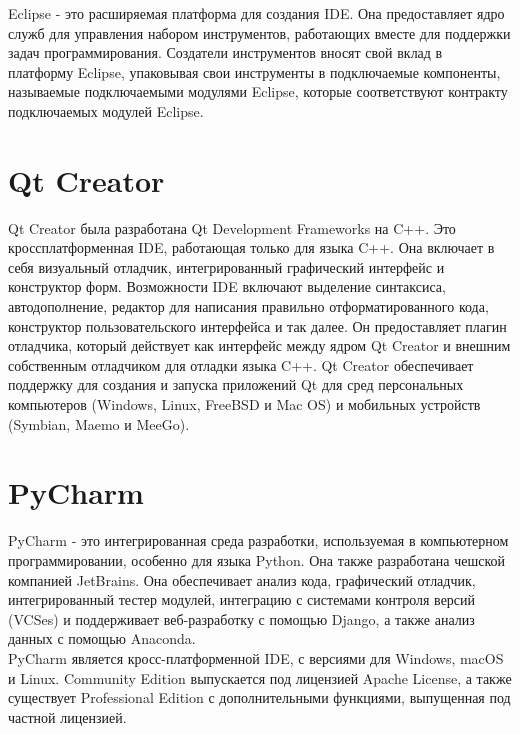 Eclipse - это расширяемая платформа для создания IDE. Она предоставляет ядро служб для управления 
набором инструментов, работающих вместе для поддержки задач программирования. Создатели 
инструментов вносят свой вклад в платформу Eclipse, упаковывая свои инструменты в подключаемые 
компоненты, называемые подключаемыми модулями Eclipse, которые соответствуют контракту подключаемых 
модулей Eclipse. \\

\section{Qt Creator}
Qt Creator была разработана Qt Development Frameworks на C++. Это кроссплатформенная IDE,
работающая только для языка C++. Она включает в себя визуальный отладчик, интегрированный 
графический интерфейс и конструктор форм. Возможности IDE включают выделение синтаксиса, 
автодополнение, редактор для написания правильно отформатированного кода, конструктор 
пользовательского интерфейса и так далее. Он предоставляет плагин отладчика, который действует как
интерфейс между ядром Qt Creator и внешним собственным отладчиком для отладки языка C++. Qt Creator
обеспечивает поддержку для создания и запуска приложений Qt для сред персональных компьютеров 
(Windows, Linux, FreeBSD и Mac OS) и мобильных устройств (Symbian, Maemo и MeeGo).\\

\section{PyCharm}
PyCharm - это интегрированная среда разработки, используемая в компьютерном программировании, 
особенно для языка Python. Она также разработана чешской компанией JetBrains. Она обеспечивает 
анализ кода, графический отладчик, интегрированный тестер модулей, интеграцию с системами контроля 
версий (VCSes) и поддерживает веб-разработку с помощью Django, а также анализ данных с помощью 
Anaconda.\\

PyCharm является кросс-платформенной IDE, с версиями для Windows, macOS и Linux. Community Edition
выпускается под лицензией Apache License, а также существует Professional Edition с дополнительными
функциями, выпущенная под частной лицензией.\\

